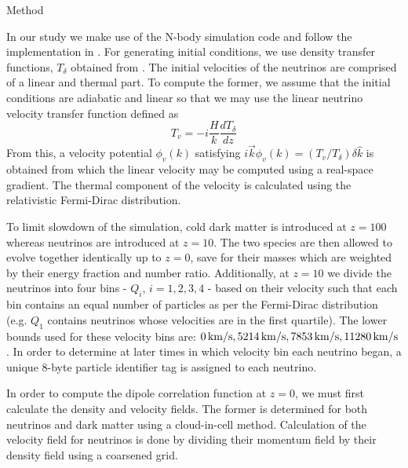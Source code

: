 \begin{section}{Method}
  \label{sec:method}

In our study we make use of the N-body simulation code 
\cpm{} and follow the implementation in \cite{bib:Inman}. 
For generating initial conditions, we use density transfer 
functions, $T_\delta$ obtained from \camb{}. The initial 
velocities of the neutrinos are comprised of a linear 
and thermal part. To compute the former, we assume that 
the initial conditions are adiabatic and linear 
so that we may use the linear neutrino velocity transfer 
function defined as
\begin{equation}
  T_v=-i\frac{H}{k}\frac{dT_{\delta}}{dz}
\end{equation}
From this, a velocity potential $\phi_{v}(k)$ satisfying 
$i\overrightarrow{k}\phi_{v}(k)=(T_v/T_\delta)\delta\hat{k}$ 
is obtained from which the linear velocity may be computed 
using a real-space gradient. The thermal component of the 
velocity is calculated using the relativistic Fermi-Dirac distribution. 

\par To limit slowdown of the simulation, cold dark matter is 
introduced at $z=100$ whereas neutrinos are introduced 
at $z=10$. The two species are then allowed to evolve together 
identically up to $z=0$, save for their masses which are weighted by their
energy fraction and number ratio. Additionally, at $z=10$ we 
divide the neutrinos into four bins - $Q_i$, $i=1,2,3,4$ - based 
on their velocity such that each bin contains an equal 
number of particles as per the Fermi-Dirac distribution (e.g. 
$Q_1$ contains neutrinos whose velocities are in the first quartile). 
The lower bounds used for these velocity bins 
are: $0\,{\rm km}/{\rm s}{}, 5214\,{\rm km}/{\rm s}{}, 7853\, {\rm km}/{\rm s}{}, 11280\,{\rm km}/{\rm s}{}$. 
In order to determine at later times in which velocity bin 
each neutrino began, a unique 8-byte particle identifier tag is 
assigned to each neutrino. 

\par In order to compute the dipole correlation function at $z=0$, we
 must first calculate the density and velocity fields. The 
former is determined for both neutrinos and dark matter 
using a cloud-in-cell method. Calculation of the 
velocity field for neutrinos is done by dividing their 
momentum field by their density field using a coarsened grid.


\end{section}
